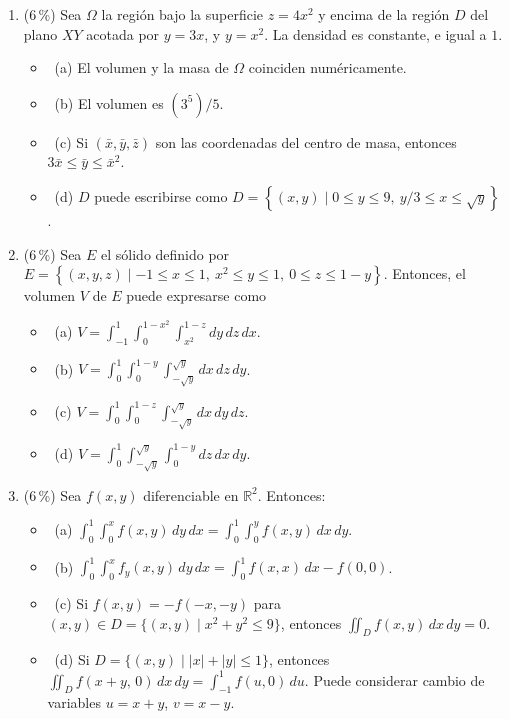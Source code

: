 \documentclass[11pt]{article}
\begin{document}
\begin{enumerate}
\item{} (6\,\%) Sea $\Omega$ la región bajo la superficie $z = 4x^2$ y encima de la región $D$ del plano $XY$ acotada por $y = 3x$, y $y = x^2$. La densidad es constante, e igual a $1$.
\begin{itemize}
\item[] \fbox{\phantom{x}}\ (a) El volumen y la masa de $\Omega$ coinciden numéricamente.
\item[] \fbox{\phantom{x}}\ (b) El volumen es $(3^5)/5$.
\item[] \fbox{\phantom{x}}\ (c) Si $(\bar x, \bar y, \bar z)$ son las coordenadas del centro de masa, entonces $3\bar x \leq \bar y \leq \bar x^2$.
\item[] \fbox{\phantom{x}}\ (d) $D$ puede escribirse como $D = \left\{(x,y) \mid 0 \leq y \leq 9,\ y/3 \leq x \leq \sqrt y\right\}$.
\end{itemize}

\item{} (6\,\%) Sea $E$ el sólido definido por $E = \left\{(x,y,z) \mid -1 \leq x \leq 1,\ x^2 \leq y \leq 1,\ 0 \leq z \leq 1 - y\right\}$. Entonces, el volumen $V$ de $E$ puede expresarse como
\begin{itemize}
\item[] \fbox{\phantom{x}}\ (a) $V = \displaystyle\int_{-1}^1 \int_0^{1-x^2} \int_{x^2}^{1-z} dy\,dz\,dx$.
\item[] \fbox{\phantom{x}}\ (b) $V = \displaystyle\int_0^1 \int_0^{1-y} \int_{-\sqrt y}^{\sqrt y} dx\,dz\,dy$.
\item[] \fbox{\phantom{x}}\ (c) $V = \displaystyle\int_0^1 \int_0^{1-z} \int_{-\sqrt y}^{\sqrt y} dx\,dy\,dz$.
\item[] \fbox{\phantom{x}}\ (d) $V = \displaystyle\int_0^1 \int_{-\sqrt y}^{\sqrt y} \int_0^{1-y} dz\,dx\,dy$.
\end{itemize}

\item{} (6\,\%) Sea $f(x,y)$ diferenciable en $\mathbb{R}^2$. Entonces:
\begin{itemize}
\item[] \fbox{\phantom{x}}\ (a) $\displaystyle\int_0^1 \int_0^x f(x,y)\,dy\,dx = \int_0^1 \int_0^y f(x,y)\,dx\,dy$.
\item[] \fbox{\phantom{x}}\ (b) $\displaystyle\int_0^1 \int_0^x f_y(x,y)\,dy\,dx = \int_0^1 f(x,x)\,dx - f(0,0)$.
\item[] \fbox{\phantom{x}}\ (c) Si $f(x,y) = -f(-x,-y)$ para $(x,y) \in D = \{(x,y) \mid x^2+y^2 \leq 9\}$, entonces $\iint_D f(x,y)\,dx\,dy = 0$.
\item[] \fbox{\phantom{x}}\ (d) Si $D = \{(x,y) \mid |x| + |y| \leq 1\}$, entonces $\iint_D f(x+y,\, 0)\,dx\,dy = \int_{-1}^1 f(u,0)\,du$. Puede considerar cambio de variables $u = x+y$, $v = x - y$.
\end{itemize}
\end{enumerate}
\end{document}
